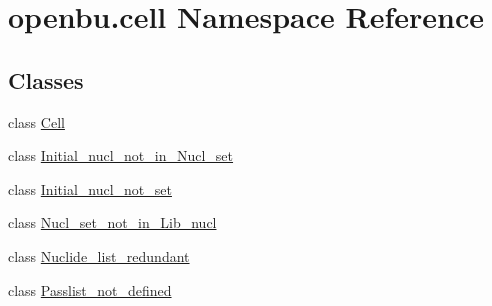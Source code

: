 \hypertarget{namespaceopenbu_1_1cell}{}\section{openbu.\+cell Namespace Reference}
\label{namespaceopenbu_1_1cell}
\subsection*{Classes}
\begin{DoxyCompactItemize}
\item 
class \mbox{\hyperlink{classopenbu_1_1cell_1_1_cell}{Cell}}
\item 
class \mbox{\hyperlink{classopenbu_1_1cell_1_1_initial__nucl__not__in___nucl__set}{Initial\+\_\+nucl\+\_\+not\+\_\+in\+\_\+\+Nucl\+\_\+set}}
\item 
class \mbox{\hyperlink{classopenbu_1_1cell_1_1_initial__nucl__not__set}{Initial\+\_\+nucl\+\_\+not\+\_\+set}}
\item 
class \mbox{\hyperlink{classopenbu_1_1cell_1_1_nucl__set__not__in___lib__nucl}{Nucl\+\_\+set\+\_\+not\+\_\+in\+\_\+\+Lib\+\_\+nucl}}
\item 
class \mbox{\hyperlink{classopenbu_1_1cell_1_1_nuclide__list__redundant}{Nuclide\+\_\+list\+\_\+redundant}}
\item 
class \mbox{\hyperlink{classopenbu_1_1cell_1_1_passlist__not__defined}{Passlist\+\_\+not\+\_\+defined}}
\end{DoxyCompactItemize}
